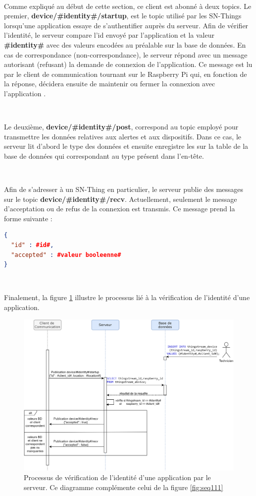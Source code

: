 ~

\noindent
Comme expliqué au début de cette section, ce client est abonné à deux topics. Le premier, \textbf{device/\#identity\#/startup}, est le topic utilisé par les SN-Things lorsqu’une application essaye de s’authentifier auprès du serveur. Afin de vérifier l’identité, le serveur compare l’id envoyé par l’application et la valeur \textbf{\#identity\#} avec des valeurs encodées au préalable sur la base de données. En cas de correspondance (non-correspondance), le serveur répond avec un message autorisant (refusant) la demande de connexion de l'application. Ce message est lu par le client de communication tournant sur le Raspberry Pi qui, en fonction de la réponse, décidera ensuite de maintenir ou fermer la connexion avec l’application .

~

\noindent
Le deuxième, \textbf{device/\#identity\#/post}, correspond au topic employé pour transmettre les données relatives aux alertes et aux dispositifs. Dans ce cas, le serveur lit d’abord le type des données et ensuite enregistre les sur la table de la base de données qui correspondant au type présent dans l’en-tête.

~

\noindent
Afin de s’adresser à un SN-Thing en particulier, le serveur publie des messages sur le topic \textbf{device/\#identity\#/recv}. Actuellement, seulement le message d’acceptation ou de refus de la connexion est transmis. Ce message prend la forme suivante :

\begin{lstlisting}[language=json]
{
  "id" : #id#,
  "accepted" : #valeur booleenne#
}
\end{lstlisting}

~

\noindent
Finalement, la figure \ref{fig:auth_app_server} illustre le processus lié à la vérification de l’identité d’une application.

\begin{figure}[ht!]
  \includegraphics[width=\textwidth]{img/app/verify_identity.png}
  \caption{Processus de vérification de l'identité d'une application par le serveur. Ce diagramme complémente celui de la figure \ref{fig:seq111}}
  \label{fig:auth_app_server}
\end{figure}


